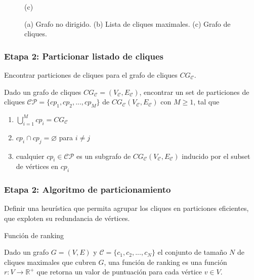 \begin{frame}
\begin{figure}
\begin{minipage}{0.15\textwidth}
    		(c)
    	\end{minipage}
    \caption{(a) Grafo no dirigido. (b) Lista de cliques maximales. (c) Grafo de cliques.}
    \label{fig:gafoEj}
\end{figure}

\end{frame}



\begin{frame}
\frametitle{Etapa 2: Particionar listado de cliques}

\begin{problem}
	\label{def:findPartitions}
	Encontrar particiones de cliques para el grafo de cliques $CG_{\mathcal{C}}$.
	
	Dado un grafo de cliques $CG_{\mathcal{C}} = (V_{\mathcal{C}}, E_{\mathcal{C}})$, encontrar un set de particiones de cliques $\mathcal{C}\mathcal{P} = \{cp_{1}, cp_{2}, ..., cp_{M}\}$ de $CG_{\mathcal{C}}(V_{\mathcal{C}}, E_{\mathcal{C}})$ con $M \geq 1$, tal que
	\begin{enumerate}
		\item $\bigcup\limits_{i = 1}^{M} cp_{i} = CG_{\mathcal{C}}$ \label{item:particiones1}
		\item $cp_{i} \cap cp_{j} = \varnothing$ para $i \neq j$ \label{item:particiones2}
		\item cualquier $cp_{i} \in \mathcal{C}\mathcal{P}$ es un subgrafo de $CG_{\mathcal{C}}(V_{\mathcal{C}}, E_{\mathcal{C}})$ inducido por el subset de vértices en $cp_{i}$ \label{item:particiones3}
	\end{enumerate}
	
\end{problem}

\end{frame}


\begin{frame}
\frametitle{Etapa 2: Algoritmo de particionamiento}

Definir una heurística que permita agrupar los cliques en particiones eficientes, que exploten su redundancia de vértices.

\begin{definition} 
	\label{def:rankingFunctions}
	Función de ranking
	
	Dado un grafo $G = (V, E)$ y $\mathcal{C} = \{c_{1}, c_{2}, ..., c_{N} \}$ el conjunto de tamaño $N$ de cliques maximales que cubren $G$, una función de ranking es una función $r: V \rightarrow \mathbb{R}^{+}$ que retorna un valor de puntuación para cada vértice $v \in V$.
\end{definition}

\end{frame}


